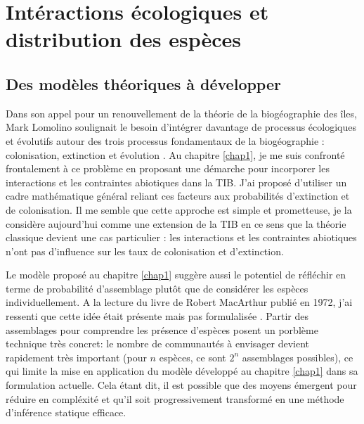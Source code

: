 \section*{Intéractions écologiques et distribution des
espèces}\label{intuxe9ractions-uxe9cologiques-et-distribution-des-espuxe8ces}

\subsection*{Des modèles théoriques à
développer}\label{des-moduxe8les-thuxe9oriques-uxe0-duxe9velopper}

Dans son appel pour un renouvellement de la théorie de la biogéographie
des îles, Mark Lomolino soulignait le besoin d'intégrer davantage de
processus écologiques et évolutifs autour des trois processus
fondamentaux de la biogéographie : colonisation, extinction et évolution
\citep{Lomolino2000}. Au chapitre \ref{chap1}, je me suis confronté
frontalement à ce problème en proposant une démarche pour incorporer les
interactions et les contraintes abiotiques dans la TIB. J'ai proposé
d'utiliser un cadre mathématique général reliant ces facteurs aux
probabilités d'extinction et de colonisation. Il me semble que cette
approche est simple et prometteuse, je la considère aujourd'hui comme
une extension de la TIB en ce sens que la théorie classique devient une
cas particulier : les interactions et les contraintes abiotiques n'ont
pas d'influence sur les taux de colonisation et d'extinction.

Le modèle proposé au chapitre \ref{chap1} suggère aussi le potentiel de
réfléchir en terme de probabilité d'assemblage \citep{Cazelles2015}
plutôt que de considérer les espèces individuellement. A la lecture du
livre de Robert MacArthur publié en 1972, j'ai ressenti que cette idée
était présente mais pas formulalisée \citep{macarthur1972geographical}.
Partir des assemblages pour comprendre les présence d'espèces posent un
porblème technique très concret: le nombre de communautés à envisager
devient rapidement très important (pour \(n\) espèces, ce sont \(2^n\)
assemblages possibles), ce qui limite la mise en application du modèle
développé au chapitre \ref{chap1} dans sa formulation actuelle. Cela
étant dit, il est possible que des moyens émergent pour réduire en
compléxité et qu'il soit progressivement transformé en une méthode
d'inférence statique efficace.

